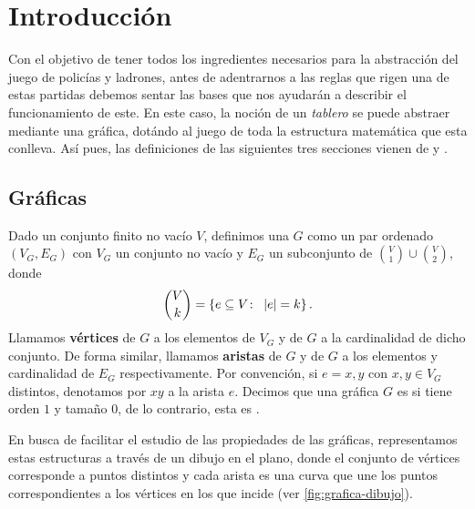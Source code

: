 \chapter{Introducci\'on}
\label{sec:intro}

Con el objetivo de tener todos los ingredientes necesarios para la abstracci\'on
del juego de polic\'ias y ladrones, antes de adentrarnos a las reglas que rigen
una de estas partidas debemos sentar las bases que nos ayudar\'an a describir el
funcionamiento de este. En este caso, la noci\'on de un \textit{tablero} se
puede abstraer mediante una gr\'afica, dot\'ando al juego de toda la estructura
matem\'atica que esta conlleva. As\'i pues, las definiciones de las siguientes
tres secciones vienen de \cite{bondy} y \cite{diestel}.

\section{Gr\'aficas}

Dado un conjunto finito no vac\'io $V$, definimos una  $G$
como un par ordenado $(V_G,E_G)$ con $V_G$ un conjunto no vac\'io y $E_G$ un
subconjunto de $\binom{V}{1} \cup \binom{V}{2}$, donde
\[
  \binom{V}{k} = \left\{ e\subseteq V \colon\ \left|e\right| = k\right\}.
\]
Llamamos \textbf{v\'ertices} de $G$ a los elementos de $V_G$ y
 de $G$ a la cardinalidad de dicho conjunto. De forma similar,
llamamos \textbf{aristas} de $G$ y  de $G$ a los
elementos y cardinalidad de $E_G$ respectivamente. Por convenci\'on, si
$e={x,y}$ con $x,y\in V_G$ distintos, denotamos por $xy$ a la arista $e$.
Decimos que una gr\'afica $G$ es  si tiene orden
$1$ y tama\~no $0$, de lo contrario, esta es .

En busca de facilitar el estudio de las propiedades de las gr\'aficas,
representamos estas estructuras a trav\'es de un dibujo en el plano, donde el
conjunto de v\'ertices corresponde a puntos distintos y cada arista es una curva
que une los puntos correspondientes a los v\'ertices en los que incide (ver
\cref{fig:grafica-dibujo}).

